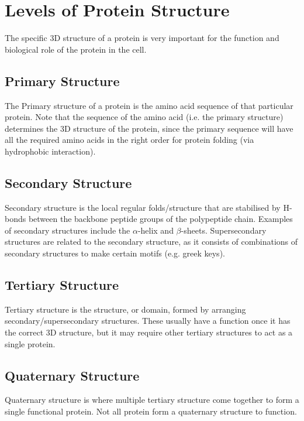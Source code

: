 \section{Levels of Protein Structure}

The specific 3D structure of a protein is very important for the function and biological role of the protein in the cell.

\subsection{Primary Structure}

The Primary structure of a protein is the amino acid sequence of that particular protein.
Note that the sequence of the amino acid (i.e. the primary structure) determines the 3D structure of the protein, since the primary sequence will have all the required amino acids in the right order for protein folding (via hydrophobic interaction).

\subsection{Secondary Structure}

Secondary structure is the local regular folds/structure that are stabilised by H-bonds between the backbone peptide groups of the polypeptide chain.
Examples of secondary structures include the $\alpha$-helix and $\beta$-sheets.
Supersecondary structures are related to the secondary structure, as it consists of combinations of secondary structures to make certain motifs (e.g. greek keys).

\subsection{Tertiary Structure}

Tertiary structure is the structure, or domain, formed by arranging secondary/supersecondary structures.
These usually have a function once it has the correct 3D structure, but it may require other tertiary structures to act as a single protein.

\subsection{Quaternary Structure}

Quaternary structure is where multiple tertiary structure come together to form a single functional protein.
Not all protein form a quaternary structure to function.

